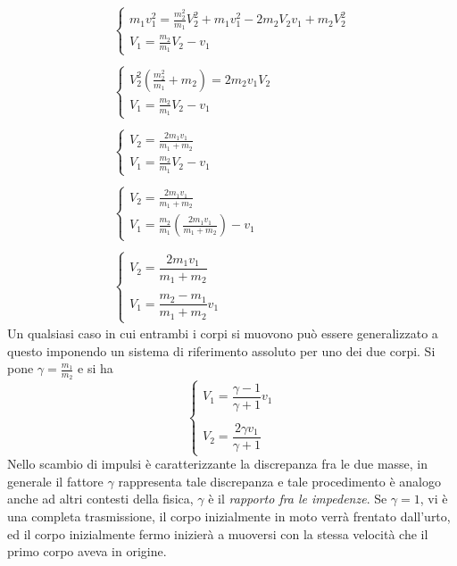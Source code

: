 \documentclass[10pt, letterpaper]{report}
\begin{document}
$$\begin{matrix}
    \begin{cases}
        m_1v_1^2=\frac{m_2^2}{m_1}V_2^2+m_1v_1^2-2m_2V_2v_1+m_2V_2^2
        \\
        V_1=\frac{m_2}{m_1}V_2-v_1 
    \end{cases} \\ \\
    \begin{cases}
        V_2^2(\frac{m_2^2}{m_1}+m_2)=2m_2v_1V_2
        \\
        V_1=\frac{m_2}{m_1}V_2-v_1 
    \end{cases}\\ \\
    \begin{cases}
        V_2=\frac{2m_1v_1}{m_1+m_2}
        \\
        V_1=\frac{m_2}{m_1}V_2-v_1 
    \end{cases}\\ \\
    \begin{cases}
        V_2=\frac{2m_1v_1}{m_1+m_2}
        \\
        V_1=\frac{m_2}{m_1}(\frac{2m_1v_1}{m_1+m_2})-v_1 
    \end{cases}\\ \\
    \begin{cases}
        V_2=\dfrac{2m_1v_1}{m_1+m_2}
        \\ \\
        V_1=\dfrac{m_2-m_1}{m_1+m_2}v_1
    \end{cases}
\end{matrix}$$
Un qualsiasi caso in cui entrambi i corpi si muovono può essere 
generalizzato a questo imponendo un sistema di riferimento 
assoluto per uno dei due corpi. Si pone $\gamma=\frac{m_1}{m_2}$ e si ha 
$$ 
\begin{cases}
    V_1=\dfrac{\gamma-1}{\gamma+1}v_1
    \\ \\
    V_2=\dfrac{2\gamma v_1}{\gamma+1}
\end{cases}
$$
Nello scambio di impulsi è caratterizzante la discrepanza fra le due masse, in generale 
il fattore $\gamma$ rappresenta tale discrepanza e tale procedimento è analogo anche 
ad altri contesti della fisica, $\gamma$ è il \textit{rapporto fra le 
impedenze}. Se $\gamma=1$, vi è una completa trasmissione, il corpo inizialmente 
in moto verrà frentato dall'urto, ed il corpo inizialmente fermo 
inizierà a muoversi con la stessa velocità che il primo corpo aveva in origine.
\end{document}
